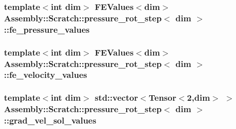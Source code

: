 \subsubsection[{fe\+\_\+pressure\+\_\+values}]{\setlength{\rightskip}{0pt plus 5cm}template$<$int dim$>$ F\+E\+Values$<$dim$>$ {\bf Assembly\+::\+Scratch\+::pressure\+\_\+rot\+\_\+step}$<$ dim $>$\+::fe\+\_\+pressure\+\_\+values}\label{struct_assembly_1_1_scratch_1_1pressure__rot__step_ac41f7bf5aa82b80e01ba8453c31e5fdd}
\hypertarget{struct_assembly_1_1_scratch_1_1pressure__rot__step_af0e05e66de3967bf2736defbcee157d5}{}
\subsubsection[{fe\+\_\+velocity\+\_\+values}]{\setlength{\rightskip}{0pt plus 5cm}template$<$int dim$>$ F\+E\+Values$<$dim$>$ {\bf Assembly\+::\+Scratch\+::pressure\+\_\+rot\+\_\+step}$<$ dim $>$\+::fe\+\_\+velocity\+\_\+values}\label{struct_assembly_1_1_scratch_1_1pressure__rot__step_af0e05e66de3967bf2736defbcee157d5}
\hypertarget{struct_assembly_1_1_scratch_1_1pressure__rot__step_a8530984bbf6ea328b90cf347b748bdc6}{}
\subsubsection[{grad\+\_\+vel\+\_\+sol\+\_\+values}]{\setlength{\rightskip}{0pt plus 5cm}template$<$int dim$>$ std\+::vector$<$Tensor$<$2,dim$>$ $>$ {\bf Assembly\+::\+Scratch\+::pressure\+\_\+rot\+\_\+step}$<$ dim $>$\+::grad\+\_\+vel\+\_\+sol\+\_\+values}\label{struct_assembly_1_1_scratch_1_1pressure__rot__step_a8530984bbf6ea328b90cf347b748bdc6}
\hypertarget{struct_assembly_1_1_scratch_1_1pressure__rot__step_aeaca955234a85e889b5c71e912240025}{}
